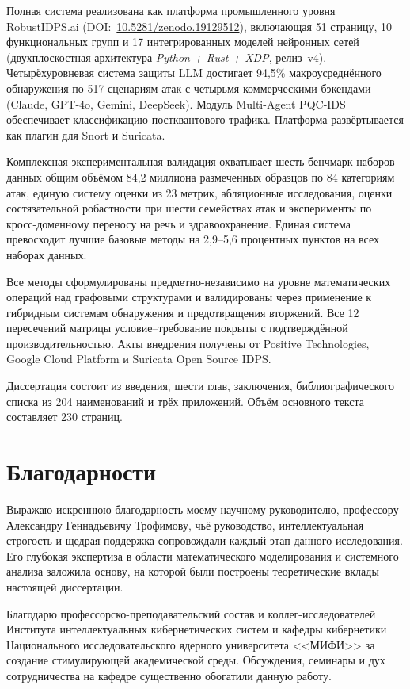 Полная система реализована как платформа промышленного уровня RobustIDPS.ai (DOI:~\url{10.5281/zenodo.19129512}), включающая 51 страницу, 10 функциональных групп и 17 интегрированных моделей нейронных сетей (двухплоскостная архитектура \emph{Python + Rust + XDP}, релиз~v4). Четырёхуровневая система защиты LLM достигает 94,5\% макроусреднённого обнаружения по 517 сценариям атак с четырьмя коммерческими бэкендами (Claude, GPT-4o, Gemini, DeepSeek). Модуль Multi-Agent PQC-IDS обеспечивает классификацию постквантового трафика. Платформа развёртывается как плагин для Snort и Suricata.

Комплексная экспериментальная валидация охватывает шесть бенчмарк-наборов данных общим объёмом 84,2 миллиона размеченных образцов по 84 категориям атак, единую систему оценки из 23 метрик, абляционные исследования, оценки состязательной робастности при шести семействах атак и эксперименты по кросс-доменному переносу на речь и здравоохранение. Единая система превосходит лучшие базовые методы на 2,9--5,6 процентных пунктов на всех наборах данных.

Все методы сформулированы предметно-независимо на уровне математических операций над графовыми структурами и валидированы через применение к гибридным системам обнаружения и предотвращения вторжений. Все 12 пересечений матрицы условие--требование покрыты с подтверждённой производительностью. Акты внедрения получены от Positive Technologies, Google Cloud Platform и Suricata Open Source IDPS.

Диссертация состоит из введения, шести глав, заключения, библиографического списка из 204 наименований и трёх приложений. Объём основного текста составляет 230 страниц.


\chapter*{Благодарности}

Выражаю искреннюю благодарность моему научному руководителю, профессору Александру Геннадьевичу Трофимову, чьё руководство, интеллектуальная строгость и щедрая поддержка сопровождали каждый этап данного исследования. Его глубокая экспертиза в области математического моделирования и системного анализа заложила основу, на которой были построены теоретические вклады настоящей диссертации.

Благодарю профессорско-преподавательский состав и коллег-исследователей Института интеллектуальных кибернетических систем и кафедры кибернетики Национального исследовательского ядерного университета <<МИФИ>> за создание стимулирующей академической среды. Обсуждения, семинары и дух сотрудничества на кафедре существенно обогатили данную работу.

